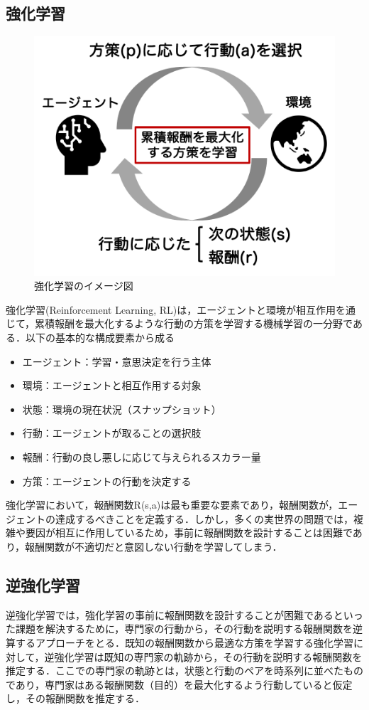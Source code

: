 \documentclass[submit,techrep,noauthor]{ipsj}
\begin{document}
\subsection{強化学習}
\begin{figure}[h]
    \centering
    \includegraphics[width=1.0\linewidth]{./Hashimoto_fig/RL.pdf}
    \caption{強化学習のイメージ図}
    \label{fig:RL}
\end{figure}


強化学習(Reinforcement Learning, RL)は，エージェントと環境が相互作用を通じて，累積報酬を最大化するような行動の方策を学習する機械学習の一分野である．以下の基本的な構成要素から成る
\begin{itemize}
    \item エージェント：学習・意思決定を行う主体
    \item 環境：エージェントと相互作用する対象
    \item 状態：環境の現在状況（スナップショット）
    \item 行動：エージェントが取ることの選択肢
    \item 報酬：行動の良し悪しに応じて与えられるスカラー量
    \item 方策：エージェントの行動を決定する
\end{itemize}
強化学習において，報酬関数R(s,a)は最も重要な要素であり，報酬関数が，エージェントの達成するべきことを定義する．しかし，多くの実世界の問題では，複雑や要因が相互に作用しているため，事前に報酬関数を設計することは困難であり，報酬関数が不適切だと意図しない行動を学習してしまう．
\subsection{逆強化学習}
逆強化学習では，強化学習の事前に報酬関数を設計することが困難であるといった課題を解決するために，専門家の行動から，その行動を説明する報酬関数を逆算するアプローチをとる．既知の報酬関数から最適な方策を学習する強化学習に対して，逆強化学習は既知の専門家の軌跡から，その行動を説明する報酬関数を推定する．ここでの専門家の軌跡とは，状態と行動のペアを時系列に並べたものであり，専門家はある報酬関数（目的）を最大化するよう行動していると仮定し，その報酬関数を推定する．
\end{document}
